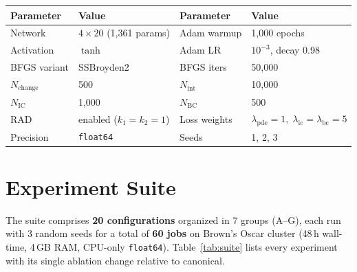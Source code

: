\documentclass[11pt,a4paper]{article}
\begin{document}
\begin{center}
\small
\begin{tabular}{@{}ll@{\qquad}ll@{}}
\toprule
\textbf{Parameter} & \textbf{Value} & \textbf{Parameter} & \textbf{Value} \\
\midrule
Network        & $4\times20$ (1,361 params) & Adam warmup  & 1,000 epochs \\
Activation     & $\tanh$                    & Adam LR      & $10^{-3}$, decay 0.98 \\
BFGS variant   & SSBroyden2                 & BFGS iters   & 50,000 \\
$N_\text{change}$ & 500                     & $N_\text{int}$ & 10,000 \\
$N_\text{IC}$  & 1,000                      & $N_\text{BC}$  & 500 \\
RAD            & enabled ($k_1\!=\!k_2\!=\!1$) & Loss weights & $\lambda_\text{pde}\!=\!1,\;\lambda_\text{ic}\!=\!\lambda_\text{bc}\!=\!5$ \\
Precision      & \texttt{float64}           & Seeds         & 1, 2, 3 \\
\bottomrule
\end{tabular}
\end{center}

\section{Experiment Suite}

The suite comprises \textbf{20 configurations} organized in 7 groups (A--G), each run with 3 random seeds for a total of \textbf{60 jobs} on Brown's Oscar cluster (48\,h wall-time, 4\,GB RAM, CPU-only \texttt{float64}).
Table~\ref{tab:suite} lists every experiment with its single ablation change relative to canonical.
\end{document}
